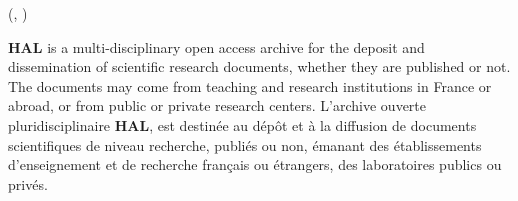 \documentclass[11pt,a4paper]{article}
\newlength{\posXhal}
\newlength{\posYhal}
\begin{document}
\begin{textblock*}{\textwidth}(\posXhal , \posYhal)
\begin{multicols}{2}
\textbf{HAL} is a multi-disciplinary open access archive for the deposit and dissemination of scientific research documents, whether they are published or not. The documents may come from teaching and research institutions in France or abroad, or from public or private research centers.
\vfill
\columnbreak
L'archive ouverte pluridisciplinaire \textbf{HAL}, est destinée au dépôt et à la diffusion de documents scientifiques de niveau recherche, publiés ou non, émanant des établissements d'enseignement et de recherche français ou étrangers, des laboratoires publics ou privés.
\end{multicols}
\end{textblock*}
\end{document}
